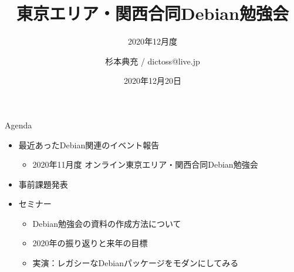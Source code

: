 \title{東京エリア・関西合同Debian勉強会}
\subtitle{2020年12月度} %
\author{杉本典充 / dictoss@live.jp}
\date{2020年12月20日}



\begin{frame}
\titlepage{}
\end{frame}

\begin{frame}{Agenda}
 \begin{minipage}[t]{0.45\hsize}
  \begin{itemize}
  \item 最近あったDebian関連のイベント報告
    \begin{itemize}
    \item 2020年11月度 オンライン東京エリア・関西合同Debian勉強会
    \end{itemize}
  \item 事前課題発表
  \end{itemize}
 \end{minipage}
 \begin{minipage}[t]{0.45\hsize}
   \begin{itemize}
   \item セミナー
     \begin{itemize}
     \item Debian勉強会の資料の作成方法について
     \item 2020年の振り返りと来年の目標
     \item 実演：レガシーなDebianパッケージをモダンにしてみる
     \end{itemize}
  \end{itemize}
 \end{minipage}
\end{frame}

